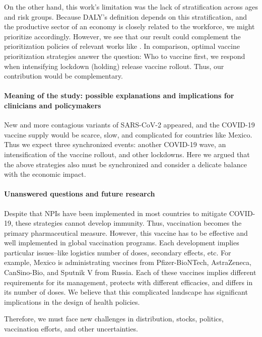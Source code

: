         On the other hand, this work's limitation was the lack of stratification
    across ages and risk groups. Because DALY's definition depends on this 
    stratification, and the productive sector of an economy is closely related 
    to the workforce, we might prioritize accordingly. However, we see that our 
    result could complement the prioritization policies of relevant works like 
    \cite{Bubar2021,Matrajt2020a,Buckner2020}. In comparison, optimal vaccine 
    prioritization strategies answer the question: Who to vaccine first, we 
    respond when intensifying lockdown (holding) release vaccine rollout. 
    Thus, our contribution would be complementary.

    \paragraph{Meaning of the study: possible explanations 
        and implications for clinicians and policymakers}

        New and more contagious variants of SARS-CoV-2 appeared, 
    and the COVID-19 vaccine supply would be scarce, slow, and 
    complicated for countries like Mexico. Thus we expect three 
    synchronized events: another COVID-19 wave, an
    intensification of the vaccine rollout, and other lockdowns. 
    Here we argued that the above strategies also must be 
    synchronized and consider a delicate balance with the 
    economic impact.

    \paragraph{Unanswered questions and future research}
        
        Despite that NPIs have been implemented in most countries to mitigate 
    COVID-19, these strategies cannot develop immunity. Thus, vaccination 
    becomes the primary pharmaceutical measure. However, this vaccine has to be 
    effective and well implemented in global vaccination programs. Each 
    development implies particular issues--like logistics number of doses, 
    secondary effects, etc. For example, Mexico is administrating vaccines from 
    Pfizer-BioNTech, AstraZeneca, CanSino-Bio, and Sputnik V from Russia. 
    Each of these vaccines implies different requirements for its management, 
    protects with different efficacies, and differs in its number of doses. 
    We believe that this complicated landscape has significant implications in 
    the design of health policies.

        Therefore, we must face new challenges in distribution, stocks, 
    politics, vaccination efforts, and other uncertainties.          
    